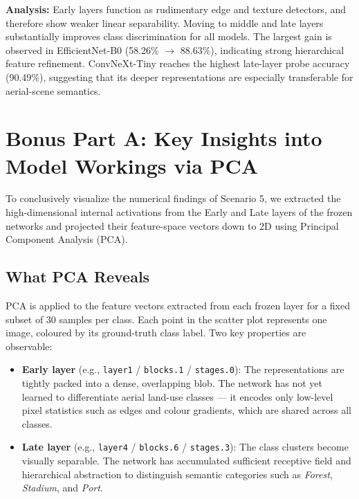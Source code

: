 \documentclass[12pt,a4paper]{article}
\begin{document}
\textbf{Analysis:} Early layers function as rudimentary edge and texture detectors, and therefore show weaker linear separability. Moving to middle and late layers substantially improves class discrimination for all models. The largest gain is observed in EfficientNet-B0 (58.26\% \(\rightarrow\) 88.63\%), indicating strong hierarchical feature refinement. ConvNeXt-Tiny reaches the highest late-layer probe accuracy (90.49\%), suggesting that its deeper representations are especially transferable for aerial-scene semantics.

\section{Bonus Part A: Key Insights into Model Workings via PCA}
\label{sec:bonus_pca}

To conclusively visualize the numerical findings of Scenario 5, we extracted the high-dimensional internal activations from the Early and Late layers of the frozen networks and projected their feature-space vectors down to 2D using Principal Component Analysis (PCA).

\subsection{What PCA Reveals}

PCA is applied to the feature vectors extracted from each frozen layer for a fixed subset of 30 samples per class. Each point in the scatter plot represents one image, coloured by its ground-truth class label. Two key properties are observable:

\begin{itemize}[nosep]
    \item \textbf{Early layer} (e.g., \texttt{layer1} / \texttt{blocks.1} / \texttt{stages.0}): The representations are tightly packed into a dense, overlapping blob. The network has not yet learned to differentiate aerial land-use classes — it encodes only low-level pixel statistics such as edges and colour gradients, which are shared across all classes.
    \item \textbf{Late layer} (e.g., \texttt{layer4} / \texttt{blocks.6} / \texttt{stages.3}): The class clusters become visually separable. The network has accumulated sufficient receptive field and hierarchical abstraction to distinguish semantic categories such as \textit{Forest}, \textit{Stadium}, and \textit{Port}.
\end{itemize}
\end{document}

